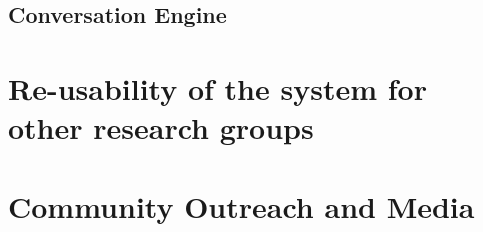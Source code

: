 \documentclass[runningheads,a4paper]{llncs}
\begin{document}
\subsection{Conversation Engine}



\section{Re-usability of the system for other research groups}


\section{Community Outreach and Media}







%
\newpage

\end{document}
